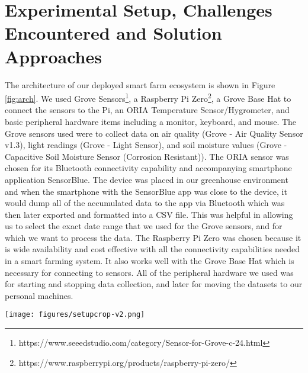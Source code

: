 \section{Experimental Setup, Challenges  Encountered and Solution Approaches}
\label{sec:arch}
The architecture of our deployed smart farm ecosystem is shown in Figure \ref{fig:arch}. We used Grove Sensors\footnote{https://www.seeedstudio.com/category/Sensor-for-Grove-c-24.html}, a Raspberry Pi Zero\footnote{https://www.raspberrypi.org/products/raspberry-pi-zero/}, a Grove Base Hat to connect the sensors to the Pi, an ORIA Temperature Sensor/Hygrometer, and basic peripheral hardware items including a monitor, keyboard, and mouse. The Grove sensors used were to collect data on air quality (Grove - Air Quality Sensor v1.3), light readings (Grove - Light Sensor), and soil moisture values (Grove - Capacitive Soil Moisture Sensor (Corrosion Resistant)). The ORIA sensor was chosen for its Bluetooth connectivity capability and accompanying smartphone application SensorBlue. The device was placed in our greenhouse environment and when the smartphone with the SensorBlue app was close to the device, it would dump all of the accumulated data to the app via Bluetooth which was then later exported and  formatted into a CSV file. This was helpful in allowing us to select the exact date range that we used for the Grove sensors, and for which we want to process the data. %
The Raspberry Pi Zero was chosen because it is wide availability and cost effective with all the connectivity capabilities needed in a smart farming system. It also works well with the Grove Base Hat which is necessary for connecting to sensors. All of the peripheral hardware we used was for starting and stopping data collection, and later for moving the datasets to our personal machines. 

\begin{figure*}[t!]
    \centering
    \texttt{[image: figures/setupcrop-v2.png]}
    \caption{Overview of Deployed Architecture}
    \label{fig:arch}
\end{figure*}

